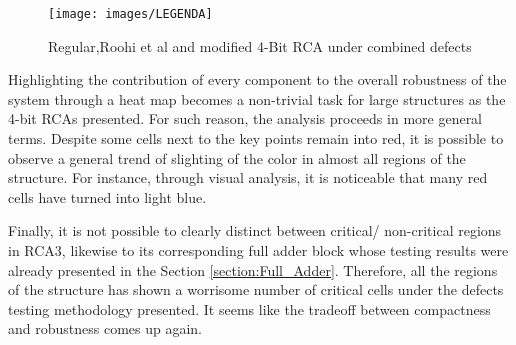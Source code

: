 \begin{figure}[H]
\center
{}
\linebreak
{}
\linebreak
{}
\linebreak
{\texttt{[image: images/LEGENDA]}
}
\caption{Regular,Roohi et al and modified 4-Bit RCA under combined defects}
\label{figure:RCA_t1}
\end{figure}

Highlighting the contribution of every component to the overall robustness of the system through a heat map becomes a non-trivial task for large structures as the 4-bit RCAs presented. For such reason, the analysis proceeds in more general terms. Despite some cells next to the key points remain into red, it is possible to observe a general trend of slighting of the color in almost all regions of the structure. For instance, through visual analysis, it is noticeable that many red cells have turned into light blue.

Finally, it is not possible to clearly distinct between critical/ non-critical regions in RCA3, likewise to its corresponding full adder block whose testing results were already presented in the Section \ref{section:Full_Adder}. Therefore, all the regions of the structure has shown a worrisome number of critical cells under the defects testing methodology presented. It seems like the tradeoff between compactness and robustness comes up again.
